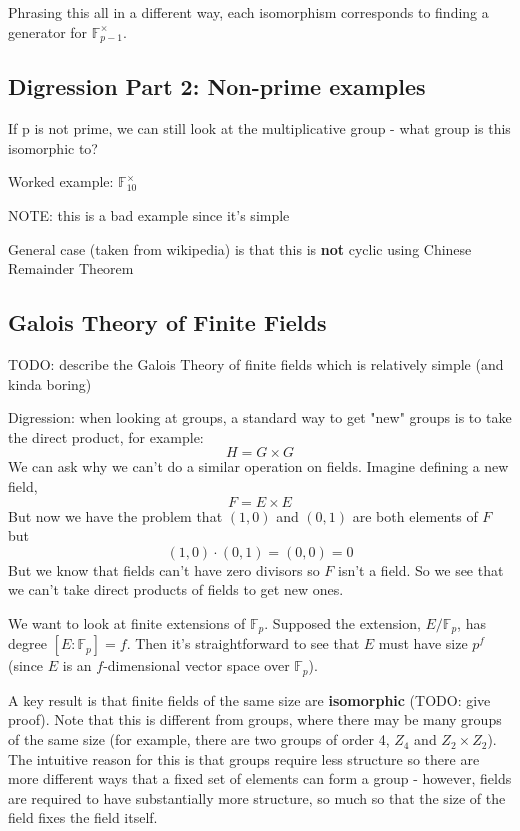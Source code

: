 \documentclass{article}
\begin{document}
Phrasing this all in a different way, each isomorphism corresponds to finding a generator for $ \mathbb{F}_{p-1}^{\times} $.

\subsection{Digression Part 2: Non-prime examples}

If p is not prime, we can still look at the multiplicative group - what group is this isomorphic to?

Worked example: $ \mathbb{F}_{10}^{\times} $

NOTE: this is a bad example since it's simple

General case (taken from wikipedia) is that this is \textbf{not} cyclic using Chinese Remainder Theorem

\subsection{Galois Theory of Finite Fields}
TODO: describe the Galois Theory of finite fields which is relatively simple (and kinda boring)

Digression: when looking at groups, a standard way to get "new" groups is to take the direct product, for example:
\begin{equation}
H = G \times G
\end{equation}
We can ask why we can't do a similar operation on fields. Imagine defining a new field,
\begin{equation}
F = E \times E
\end{equation}
But now we have the problem that \((1, 0)\) and \((0, 1)\) are both elements of $ F $ but
\begin{equation}
(1, 0) \cdot (0, 1) = (0, 0) = 0
\end{equation}
But we know that fields can't have zero divisors so $ F $ isn't a field. So we see that we can't take direct products of fields to get new ones.

We want to look at finite extensions of $ \mathbb{F}_{p} $. Supposed the extension, $ E / \mathbb{F}_{p} $, has degree $ [E : \mathbb{F}_{p}] = f $. Then it's straightforward to see that $ E $ must have size $ p^{f} $ (since $ E $ is an $f$-dimensional vector space over $\mathbb{F}_{p}$).

A key result is that finite fields of the same size are \textbf{isomorphic} (TODO: give proof). Note that this is different from groups, where there may be many groups of the same size (for example, there are two groups of order 4, $ Z_{4} $ and $ Z_{2} \times Z_{2} $). The intuitive reason for this is that groups require less structure so there are more different ways that a fixed set of elements can form a group - however, fields are required to have substantially more structure, so much so that the size of the field fixes the field itself.
\end{document}
